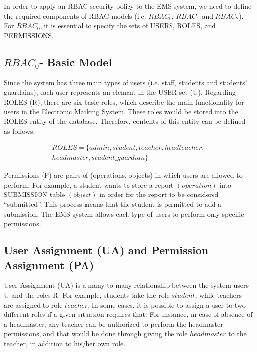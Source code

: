 In order to apply an RBAC security policy to the EMS system, we need to define the required components of RBAC models (i.e. $RBAC_0$, $RBAC_1$ and $RBAC_2$).  For $RBAC_0$, it is essential to specify the sets of USERS, ROLES, and PERMISSIONS.

\subsection{$RBAC_0$- Basic Model}
Since the system has three main types of users (i.e. staff, students and students' guardains), each user represents an element in the USER set (U).  Regarding ROLES (R), there are six basic roles, which describe the main functionality for users in the Electronic Marking System.  These roles would be stored into the ROLES entity of the database.  Therefore, contents of this entity can be defined as follows:

\begin{align*}
ROLES = \{admin, student, teacher, headteacher, \\headmaster, student\_guardian\}
\end{align*}


Permissions (P) are pairs of (operations, objects) in which users are allowed to perform.  For example, a student wants to store a report $(operation)$ into SUBMISSION table $(object)$ in order for the report to be considered “submitted”.  This process means that the student is permitted to add a submission.  The EMS system allows each type of users to perform only specific permissions. 


\subsection{User Assignment (UA) and Permission Assignment (PA)}
User Assignment (UA) is a many-to-many relationship between the system users U and the roles R.  For example, students take the role $student$, while teachers are assigned to role $teacher$.  In some cases, it is possible to assign a user to two different roles if a given situation requires that.  For instance, in case of absence of a headmaster, any teacher can be authorized to perform the headmaster permissions, and that would be done through giving the role $headmaster$ to the teacher, in addition to his/her own role.


